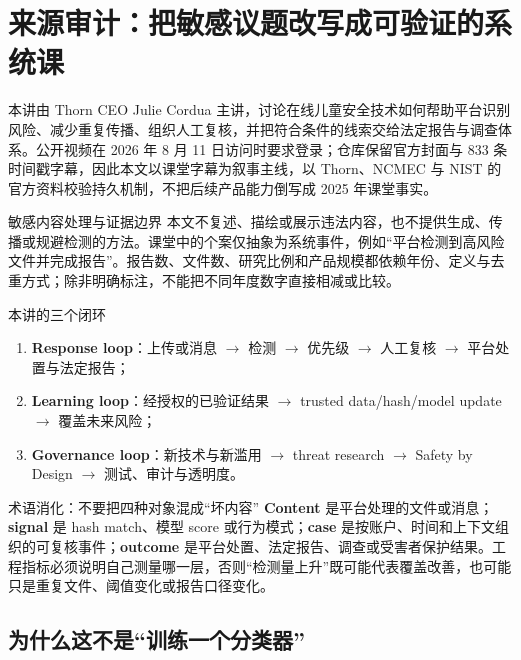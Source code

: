 \section{来源审计：把敏感议题改写成可验证的系统课}

本讲由 Thorn CEO Julie Cordua 主讲，讨论在线儿童安全技术如何帮助平台识别风险、减少重复传播、组织人工复核，并把符合条件的线索交给法定报告与调查体系。公开视频在 2026 年 8 月 11 日访问时要求登录；仓库保留官方封面与 833 条时间戳字幕，因此本文以课堂字幕为叙事主线，以 Thorn、NCMEC 与 NIST 的官方资料校验持久机制，不把后续产品能力倒写成 2025 年课堂事实。

\begin{warningbox}{敏感内容处理与证据边界}
本文不复述、描绘或展示违法内容，也不提供生成、传播或规避检测的方法。课堂中的个案仅抽象为系统事件，例如“平台检测到高风险文件并完成报告”。报告数、文件数、研究比例和产品规模都依赖年份、定义与去重方式；除非明确标注，不能把不同年度数字直接相减或比较。
\end{warningbox}

\begin{importantbox}{本讲的三个闭环}
\begin{enumerate}
  \item \textbf{Response loop}：上传或消息 $\rightarrow$ 检测 $\rightarrow$ 优先级 $\rightarrow$ 人工复核 $\rightarrow$ 平台处置与法定报告；
  \item \textbf{Learning loop}：经授权的已验证结果 $\rightarrow$ trusted data/hash/model update $\rightarrow$ 覆盖未来风险；
  \item \textbf{Governance loop}：新技术与新滥用 $\rightarrow$ threat research $\rightarrow$ Safety by Design $\rightarrow$ 测试、审计与透明度。
\end{enumerate}
\end{importantbox}

\begin{knowledgebox}{术语消化：不要把四种对象混成“坏内容”}
\textbf{Content} 是平台处理的文件或消息；\textbf{signal} 是 hash match、模型 score 或行为模式；\textbf{case} 是按账户、时间和上下文组织的可复核事件；\textbf{outcome} 是平台处置、法定报告、调查或受害者保护结果。工程指标必须说明自己测量哪一层，否则“检测量上升”既可能代表覆盖改善，也可能只是重复文件、阈值变化或报告口径变化。
\end{knowledgebox}

\subsection{为什么这不是“训练一个分类器”}


